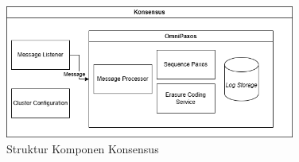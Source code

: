 \begin{figure}[ht]
	\centering
	\includegraphics[width=0.85\textwidth]{resources/chapter-3/consensus-architecture.png}
	\caption{Struktur Komponen Konsensus}
	\label{fig:consensus-component-structure}
\end{figure}
